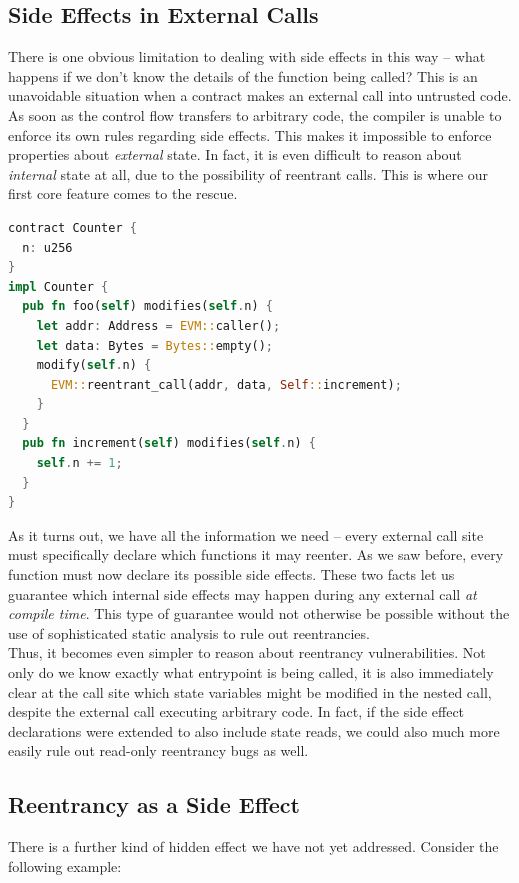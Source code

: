 \subsection{Side Effects in External Calls}

There is one obvious limitation to dealing with side effects in this way -- what happens if we don't know the details of the function being called? This is an unavoidable situation when a contract makes an external call into untrusted code. As soon as the control flow transfers to arbitrary code, the compiler is unable to enforce its own rules regarding side effects. This makes it impossible to enforce properties about \textit{external} state. In fact, it is even difficult to reason about \textit{internal} state at all, due to the possibility of reentrant calls. This is where our first core feature comes to the rescue.
\begin{lstlisting}[language=Rust, style=boxed]
contract Counter {
  n: u256
}
impl Counter {
  pub fn foo(self) modifies(self.n) {
    let addr: Address = EVM::caller();
    let data: Bytes = Bytes::empty();
    modify(self.n) {
      EVM::reentrant_call(addr, data, Self::increment);
    }
  }
  pub fn increment(self) modifies(self.n) {
    self.n += 1;
  }
}
\end{lstlisting}
As it turns out, we have all the information we need -- every external call site must specifically declare which functions it may reenter. As we saw before, every function must now declare its possible side effects. These two facts let us guarantee which internal side effects may happen during any external call \textit{at compile time}. This type of guarantee would not otherwise be possible without the use of sophisticated static analysis to rule out reentrancies. \\
Thus, it becomes even simpler to reason about reentrancy vulnerabilities. Not only do we know exactly what entrypoint is being called, it is also immediately clear at the call site which state variables might be modified in the nested call, despite the external call executing arbitrary code. In fact, if the side effect declarations were extended to also include state reads, we could also much more easily rule out read-only reentrancy bugs as well.

\subsection{Reentrancy as a Side Effect}
There is a further kind of hidden effect we have not yet addressed. Consider the following example:

